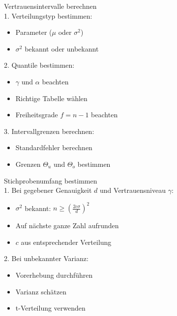\begin{KR}{Vertrauensintervalle berechnen}\\
1. Verteilungstyp bestimmen:
   \begin{itemize}
     \item Parameter ($\mu$ oder $\sigma^2$)
     \item $\sigma^2$ bekannt oder unbekannt
   \end{itemize}

2. Quantile bestimmen:
   \begin{itemize}
     \item $\gamma$ und $\alpha$ beachten
     \item Richtige Tabelle wählen
     \item Freiheitsgrade $f=n-1$ beachten
   \end{itemize}

3. Intervallgrenzen berechnen:
   \begin{itemize}
     \item Standardfehler berechnen
     \item Grenzen $\Theta_u$ und $\Theta_o$ bestimmen
   \end{itemize}
\end{KR}

\begin{KR}{Stichprobenumfang bestimmen}\\
1. Bei gegebener Genauigkeit $d$ und Vertrauensniveau $\gamma$:
   \begin{itemize}
     \item $\sigma^2$ bekannt: $n \geq (\frac{2c\sigma}{d})^2$
     \item Auf nächste ganze Zahl aufrunden
     \item $c$ aus entsprechender Verteilung
   \end{itemize}

2. Bei unbekannter Varianz:
   \begin{itemize}
     \item Vorerhebung durchführen
     \item Varianz schätzen
     \item t-Verteilung verwenden
   \end{itemize}
\end{KR}

